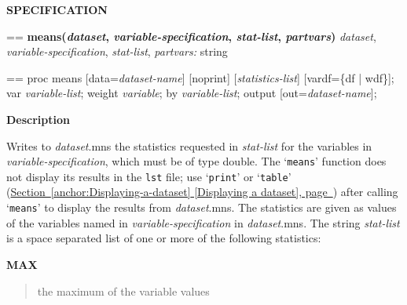 \documentclass{book}
\makeatletter
\newcommand\Texinfocommandstyletextvar[1]{{\normalfont{}\textsl{#1}}}%
\newenvironment{Texinfopreformatted}{%
  \par\GNUTobeylines\obeyspaces\frenchspacing\parskip=\z@\parindent=\z@}{}
{\catcode`\^^M=13 \gdef\GNUTobeylines{\catcode`\^^M=13 \def^^M{\null\par}}}
\newenvironment{Texinfoindented}{\begin{list}{}{}\item\relax}{\end{list}}
\renewcommand{\_}{\Texinfounderscore\discretionary{}{}{}}
\makeatother
\begin{document}
\noindent{}\textbf{SPECIFICATION}
\begin{Texinfoindented}
\begin{Texinfopreformatted}%
\textbf{means(\Texinfocommandstyletextvar{dataset}, \Texinfocommandstyletextvar{variable-specification}, \Texinfocommandstyletextvar{stat-list}, \Texinfocommandstyletextvar{partvars})}
\Texinfocommandstyletextvar{dataset}, \Texinfocommandstyletextvar{variable-specification}, \Texinfocommandstyletextvar{stat-list}, \Texinfocommandstyletextvar{partvars:} string
\end{Texinfopreformatted}
\end{Texinfoindented}

\begin{Texinfoindented}
\begin{Texinfopreformatted}%
proc means [data=\Texinfocommandstyletextvar{dataset-name}] [noprint] [\Texinfocommandstyletextvar{statistics-list}]
           [vardf=\{df | wdf\}];
var \Texinfocommandstyletextvar{variable-list};
weight \Texinfocommandstyletextvar{variable};
by \Texinfocommandstyletextvar{variable-list};
output [out=\Texinfocommandstyletextvar{dataset-name}];
\end{Texinfopreformatted}
\end{Texinfoindented}

%

\noindent{}\textbf{Description}

Writes to \Texinfocommandstyletextvar{dataset}.mns the statistics requested in
\Texinfocommandstyletextvar{stat-list} for the variables in \Texinfocommandstyletextvar{variable-specification}, which must be
of type double.
The `\texttt{means}' function does not display its results in the \texttt{lst} file; use
`\texttt{print}' or `\texttt{table}' (\hyperref[anchor:Displaying-a-dataset]{Section~\ref*{anchor:Displaying-a-dataset} [Displaying a dataset], page~\pageref*{anchor:Displaying-a-dataset}}) after
calling `\texttt{means}' to display the results from \Texinfocommandstyletextvar{dataset}.mns.
The statistics are given as values of the variables named in \Texinfocommandstyletextvar{variable-specification}
in \Texinfocommandstyletextvar{dataset}.mns.
The string \Texinfocommandstyletextvar{stat-list}
is a space separated list of one or more of the following statistics:

\textbf{MAX}
\begin{quote}
the maximum of the variable values
\end{quote}
%
\end{document}
